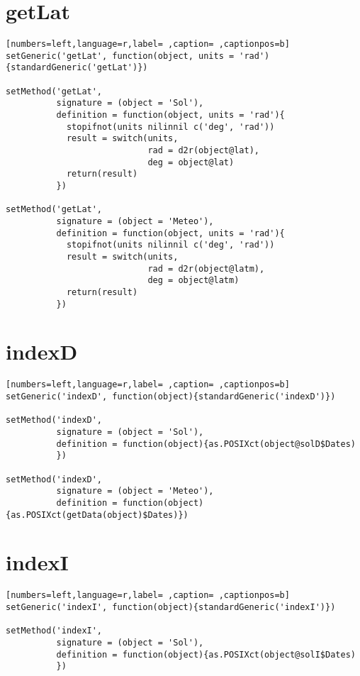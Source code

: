 \section{getLat}
\label{sec:org50f7289}
\begin{lstlisting}[numbers=left,language=r,label= ,caption= ,captionpos=b]
setGeneric('getLat', function(object, units = 'rad')
{standardGeneric('getLat')})

setMethod('getLat',
          signature = (object = 'Sol'),
          definition = function(object, units = 'rad'){
            stopifnot(units nilinnil c('deg', 'rad'))
            result = switch(units,
                            rad = d2r(object@lat),
                            deg = object@lat)
            return(result)
          })

setMethod('getLat',
          signature = (object = 'Meteo'),
          definition = function(object, units = 'rad'){
            stopifnot(units nilinnil c('deg', 'rad'))
            result = switch(units,
                            rad = d2r(object@latm),
                            deg = object@latm)
            return(result)
          })
\end{lstlisting}
\section{indexD}
\label{sec:org7f50531}
\begin{lstlisting}[numbers=left,language=r,label= ,caption= ,captionpos=b]
setGeneric('indexD', function(object){standardGeneric('indexD')})

setMethod('indexD',
          signature = (object = 'Sol'),
          definition = function(object){as.POSIXct(object@solD$Dates)
          })

setMethod('indexD',
          signature = (object = 'Meteo'),
          definition = function(object){as.POSIXct(getData(object)$Dates)})
\end{lstlisting}
\section{indexI}
\label{sec:org3dd5fcd}
\begin{lstlisting}[numbers=left,language=r,label= ,caption= ,captionpos=b]
setGeneric('indexI', function(object){standardGeneric('indexI')})

setMethod('indexI',
          signature = (object = 'Sol'),
          definition = function(object){as.POSIXct(object@solI$Dates)
          })
\end{lstlisting}
